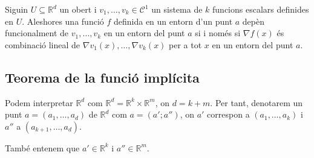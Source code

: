 \documentclass[../Apunts.tex]{subfiles}
\begin{document}
	\begin{corollary}\label{corollary:dependència funcional iff dependència lineal dels gradients}
		Siguin \(U\subseteq\mathbb{R}^{d}\) un obert i \(v_{1},\dots,v_{k}\in\mathcal{C}^{1}\) un sistema de \(k\) funcions escalars definides en \(U\). Aleshores una funció \(f\) definida en un entorn d'un punt \(a\) depèn funcionalment de \(v_{1},\dots,v_{k}\) en un entorn del punt \(a\) si i només si \(\nabla f(x)\) és combinació lineal de \(\nabla v_{1}(x),\dots,\nabla v_{k}(x)\) per a tot \(x\) en un entorn del punt \(a\).
	\end{corollary}
	\subsection{Teorema de la funció implícita}
	\begin{notation}\label{notation:punts per grups}
		Podem interpretar \(\mathbb{R}^{d}\) com \(\mathbb{R}^{d}=\mathbb{R}^{k}\times\mathbb{R}^{m}\), on \(d=k+m\). Per tant, denotarem un punt \(a=(a_{1},\dots,a_{d})\) de \(\mathbb{R}^{d}\) com \(a=(a';a'')\), on \(a'\) correspon a \((a_{1},\dots,a_{k})\) i \(a''\) a \((a_{k+1},\dots,a_{d})\).%
		
		També entenem que \(a'\in\mathbb{R}^{k}\) i \(a''\in\mathbb{R}^{m}\).
	\end{notation}
\end{document}
